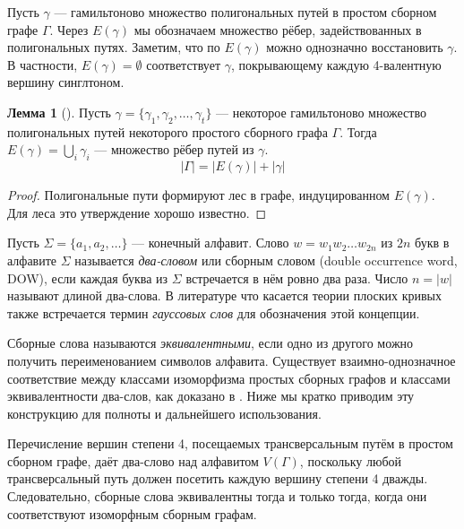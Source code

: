 \documentclass{article}
\theoremstyle{definition}
\newtheorem{lemma}[theorem]{Лемма}
\begin{document}
Пусть $\gamma$ — гамильтоново множество полигональных путей в простом сборном графе $\Gamma$. Через $E(\gamma)$ мы обозначаем множество рёбер, задействованных в полигональных путях. Заметим, что по $E(\gamma)$ можно однозначно восстановить $\gamma$. В частности, $E(\gamma) = \emptyset$ соответствует $\gamma$, покрывающему каждую 4-валентную вершину синглтоном.

\begin{lemma}[\cite{MaksaevPreprint}]\label{lemma:edge-setsize-rel}
    Пусть $\gamma = \{\gamma_1, \gamma_2, \dots,\gamma_t\}$ — некоторое гамильтоново множество полигональных путей некоторого простого сборного графа $\Gamma$. Тогда $E(\gamma) = \bigcup_i\gamma_i$ — множество рёбер путей из $\gamma$.
    \[
    |\Gamma| = |E(\gamma)| + |\gamma|
    \]
\end{lemma}

\begin{proof}
    Полигональные пути формируют лес в графе, индуцированном $E(\gamma)$. Для леса это утверждение хорошо известно.
\end{proof}

Пусть $\Sigma=\{a_1,a_2,\ldots\}$ — конечный алфавит. Слово $w=w_1w_2\ldots w_{2n}$ из $2n$ букв в алфавите $\Sigma$ называется \emph{два-словом} или сборным словом (double occurrence word, DOW), если каждая буква из $\Sigma$ встречается в нём ровно два раза. Число $n=|w|$ называют длиной два-слова. В литературе что касается теории плоских кривых также встречается термин \emph{гауссовых слов} для обозначения этой концепции. 

Сборные слова называются \textit{эквивалентными}, если одно из другого можно получить переименованием символов алфавита. Существует взаимно-однозначное соответствие между классами изоморфизма простых сборных графов и классами эквивалентности два-слов, как доказано в \cite[Лемма 3.8]{Angeleska2009}. Ниже мы кратко приводим эту конструкцию для полноты и дальнейшего использования.

Перечисление вершин степени 4, посещаемых трансверсальным путём в простом сборном графе, даёт два-слово над алфавитом \(V(\Gamma)\), поскольку любой трансверсальный путь должен посетить каждую вершину степени 4 дважды. Следовательно, сборные слова эквивалентны тогда и только тогда, когда они соответствуют изоморфным сборным графам.
\end{document}
